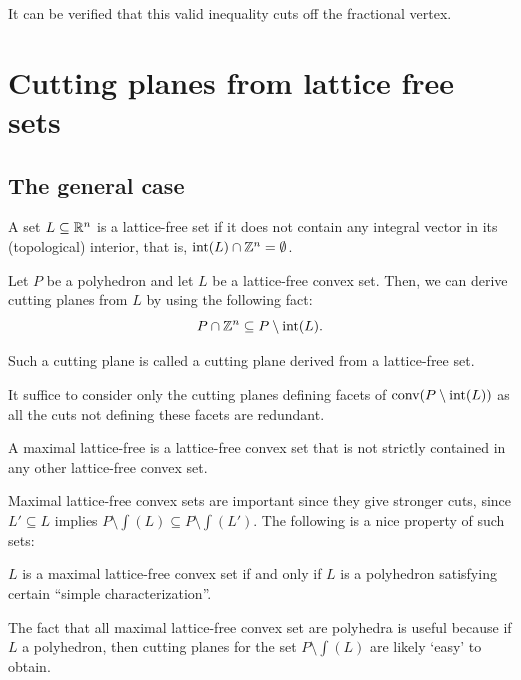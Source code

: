 \documentclass[../open-optimization/open-optimization.tex]{subfiles}
\begin{document}
It can be verified that this valid inequality cuts off the fractional vertex.



\section{Cutting planes from lattice free sets}
\subsection{ The general case}

\begin{definition}  {\color{blue} A set $L\subseteq {\mathbb{R}}^n$ is a lattice-free set if it does not contain any integral vector in its (topological) interior, that is, ${\textup{int}}(L)\cap{\mathbb{Z}}^n=\emptyset$.}
\end{definition}


Let $P$ be a polyhedron and let $L$ be a lattice-free convex set. Then, we can derive cutting planes from $L$ by using the following fact:
$$P\cap {\mathbb{Z}}^n\subseteq P\setminus {\textup{int}}(L).$$

Such a cutting plane is called a cutting plane derived from a lattice-free set. 
\begin{remark}
It suffice to consider only the cutting planes defining facets of $\textup{conv}(P\setminus{\textup{int}}(L))$ as all the cuts not defining these facets are redundant.
\end{remark}


\begin{definition}  A maximal lattice-free is a lattice-free convex set that is not strictly contained in any other lattice-free convex set.
\end{definition}


Maximal lattice-free convex sets are important since they give stronger cuts, since $L'\subseteq L$ implies $P\setminus\int(L)\subseteq P\setminus\int(L')$. The following is a nice property of such sets:
\begin{theorem} $L$ is a maximal lattice-free convex set if and only if $L$ is a polyhedron satisfying certain ``simple characterization''.
\end{theorem}
\begin{remark}
The fact that all maximal lattice-free convex set are polyhedra is useful because if $L$ a polyhedron, then cutting planes for the set $P\setminus \int(L)$ are likely `easy' to obtain.
\end{remark}
\end{document}
